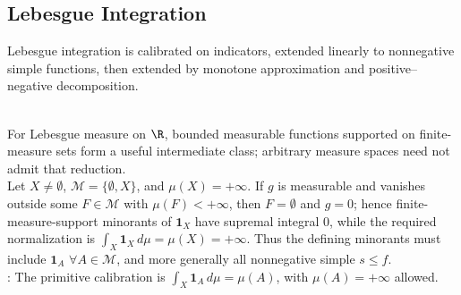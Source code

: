\subsection{Lebesgue Integration}

%

Lebesgue integration is calibrated on indicators, extended linearly to nonnegative simple functions, then extended by monotone approximation and positive--negative decomposition.

\begin{perspective} \label{per:why-general-integral-uses-simple-minorants} \\
For Lebesgue measure on $\R$, bounded measurable functions supported on finite-measure sets form a useful intermediate class; arbitrary measure spaces need not admit that reduction.\\
Let $X\neq\emptyset$, $\mathcal{M}=\{\emptyset,X\}$, and $\mu(X)=+\infty$. If $g$ is measurable and vanishes outside some $F\in\mathcal{M}$ with $\mu(F)<+\infty$, then $F=\emptyset$ and $g=0$; hence finite-measure-support minorants of $\mathbf{1}_X$ have supremal integral $0$, while the required normalization is $\int_X\mathbf{1}_X\,d\mu=\mu(X)=+\infty$. Thus the defining minorants must include $\mathbf{1}_A$ $\forall A\in\mathcal{M}$, and more generally all nonnegative simple $s\leq f$.\\
: The primitive calibration is $\int_X\mathbf{1}_A\,d\mu=\mu(A)$, with $\mu(A)=+\infty$ allowed.
\end{perspective}

